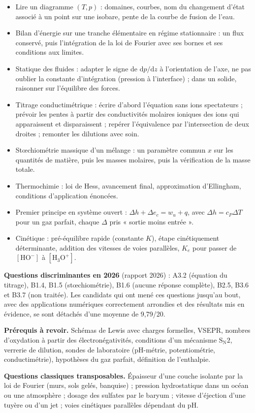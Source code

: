 \documentclass[11pt,a4paper]{article}
\providecommand{\tightlist}{\setlength{\itemsep}{0pt}\setlength{\parskip}{0pt}}
\begin{document}
\begin{itemize}
\tightlist
\item
  Lire un diagramme \((T,p)\) : domaines, courbes, nom du changement d'état associé à un point sur une isobare, pente de la courbe de fusion de l'eau.
\item
  Bilan d'énergie sur une tranche élémentaire en régime stationnaire : un flux conservé, puis l'intégration de la loi de Fourier avec ses bornes et ses conditions aux limites.
\item
  Statique des fluides : adapter le signe de \(\mathrm{d}p/\mathrm{d}z\) à l'orientation de l'axe, ne pas oublier la constante d'intégration (pression à l'interface) ; dans un solide, raisonner sur l'équilibre des forces.
\item
  Titrage conductimétrique : écrire d'abord l'équation sans ions spectateurs ; prévoir les pentes à partir des conductivités molaires ioniques des ions qui apparaissent et disparaissent ; repérer l'équivalence par l'intersection de deux droites ; remonter les dilutions avec soin.
\item
  Stœchiométrie massique d'un mélange : un paramètre commun \(x\) sur les quantités de matière, puis les masses molaires, puis la vérification de la masse totale.
\item
  Thermochimie : loi de Hess, avancement final, approximation d'Ellingham, conditions d'application énoncées.
\item
  Premier principe en système ouvert : \(\Delta h + \Delta e_c = w_u + q\), avec \(\Delta h = c_P \Delta T\) pour un gaz parfait, chaque \(\Delta\) pris « sortie moins entrée ».
\item
  Cinétique : pré-équilibre rapide (constante \(K\)), étape cinétiquement déterminante, addition des vitesses de voies parallèles, \(K_e\) pour passer de \([\mathrm{HO^-}]\) à \([\mathrm{H_3O^+}]\).
\end{itemize}

\textbf{Questions discriminantes en 2026} (rapport 2026) : A3.2 (équation du titrage), B1.4, B1.5 (stœchiométrie), B1.6 (aucune réponse complète), B2.5, B3.6 et B3.7 (non traitée). Les candidats qui ont mené ces questions jusqu'au bout, avec des applications numériques correctement arrondies et des résultats mis en évidence, se sont détachés d'une moyenne de 9,79/20.

\textbf{Prérequis à revoir.} Schémas de Lewis avec charges formelles, VSEPR, nombres d'oxydation à partir des électronégativités, conditions d'un mécanisme \(\mathrm{S_N2}\), verrerie de dilution, sondes de laboratoire (pH-métrie, potentiométrie, conductimétrie), hypothèses du gaz parfait, définition de l'enthalpie.

\textbf{Questions classiques transposables.} Épaisseur d'une couche isolante par la loi de Fourier (murs, sols gelés, banquise) ; pression hydrostatique dans un océan ou une atmosphère ; dosage des sulfates par le baryum ; vitesse d'éjection d'une tuyère ou d'un jet ; voies cinétiques parallèles dépendant du pH.
\end{document}
